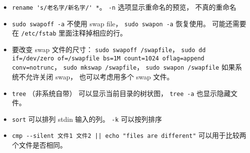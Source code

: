\begin{itemize}
\item \verb|rename 's/老名字/新名字/' *|。 \verb|-n| 选项显示重命名的预览， 不真的重命名
\item \verb|sudo swapoff -a| 不使用 swap file， \verb|sudo swapon -a| 恢复使用。 可能还需要在 \verb|/etc/fstab| 里面注释掉相应的行。
\item 要改变 swap 文件的尺寸： \verb|sudo swapoff /swapfile|， \verb|sudo dd if=/dev/zero of=/swapfile bs=1M count=1024 oflag=append conv=notrunc|， \verb|sudo mkswap /swapfile|， \verb|sudo swapon /swapfile| 如果系统不允许关闭 swap， 也可以考虑用多个 swap 文件。
\item \verb|tree| （非系统自带） 可以显示当前目录的树状图， \verb|tree -a| 也显示隐藏文件。
\item \verb|sort| 可以排列 stdin 输入的列。 \verb|-k| 可以按列排序
\item \verb`cmp --silent 文件1 文件2 || echo "files are different"` 可以用于比较两个文件是否相同。
\end{itemize}

